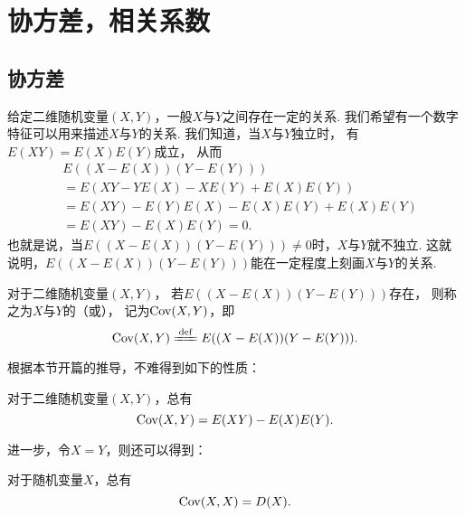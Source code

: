 \section{协方差，相关系数}
\subsection{协方差}
给定二维随机变量\((X,Y)\)，一般\(X\)与\(Y\)之间存在一定的关系.
我们希望有一个数字特征可以用来描述\(X\)与\(Y\)的关系.
我们知道，当\(X\)与\(Y\)独立时，
有\(E(XY) = E(X) E(Y)\)成立，
从而\begin{align*}
    &E((X-E(X))(Y-E(Y))) \\
    &= E(XY - Y E(X) - X E(Y) + E(X) E(Y)) \\
    &= E(XY) - E(Y) E(X) - E(X) E(Y) + E(X) E(Y) \\
    &= E(XY) - E(X) E(Y) = 0.
\end{align*}
也就是说，当\(E((X-E(X))(Y-E(Y))) \neq 0\)时，\(X\)与\(Y\)就不独立.
这就说明，\(E((X-E(X))(Y-E(Y)))\)能在一定程度上刻画\(X\)与\(Y\)的关系.

\begin{definition}
对于二维随机变量\((X,Y)\)，
若\(E((X-E(X))(Y-E(Y)))\)存在，
则称之为\(X\)与\(Y\)的（或），
记为\(\operatorname{Cov}(X,Y)\)，即
\begin{equation}\label{equation:随机变量的数字特征.协方差的定义式}
    \Cov(X,Y) \defeq E((X-E(X))(Y-E(Y))).
\end{equation}
\end{definition}

根据本节开篇的推导，不难得到如下的性质：
\begin{property}\label{theorem:随机变量的数字特征.协方差的性质1}
对于二维随机变量\((X,Y)\)，总有
\begin{equation}\label{equation:随机变量的数字特征.协方差的计算式1}
    \operatorname{Cov}(X,Y) = E(XY) - E(X) E(Y).
\end{equation}
\end{property}

进一步，令\(X = Y\)，则还可以得到：
\begin{property}\label{theorem:随机变量的数字特征.协方差的性质2}
对于随机变量\(X\)，总有
\begin{equation}\label{equation:随机变量的数字特征.协方差与方差的联系1}
    \operatorname{Cov}(X,X) = D(X).
\end{equation}
\end{property}

